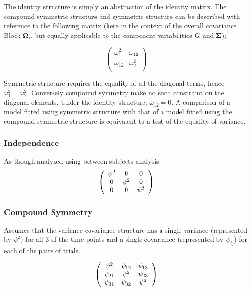 \documentclass[12pt, a4paper]{report}
\theoremstyle{plain}
\theoremstyle{definition}
\theoremstyle{remark}
\begin{document}
	The identity structure is simply an abstraction of the identity matrix. The compound symmetric structure and symmetric structure can be described with reference to the following matrix (here in the context of the overall covariance Block-$\boldsymbol{\Omega}_i$, but equally applicable to the component variabilities $\boldsymbol{G}$ and $\boldsymbol{\Sigma}$);
	
	\[\left( \begin{array}{cc}
	\omega^2_1  & \omega_{12} \\
	\omega_{12} & \omega^2_2 \\
	\end{array}\right) \]
	
	Symmetric structure requires the equality of all the diagonal terms, hence $\omega^2_1 = \omega^2_2$. Conversely compound symmetry make no such constraint on the diagonal elements. Under the identity structure, $\omega_{12} = 0$.
	A comparison of a model fitted using symmetric structure with that of a model fitted using the compound symmetric structure is equivalent to a test of the equality of variance.
	
	

		\subsubsection*{Independence}
		
		As though analyzed using between subjects analysis.
		\[
		\left(
		\begin{array}{c c c}
		\psi^2 & 0 & 0   \\
		0 & \psi^2 & 0   \\
		0 & 0 & \psi^2   \\
		\end{array}%
		\right)
		\]	

			
	\subsubsection*{Compound Symmetry}
	
	Assumes that the variance-covariance structure has a single variance (represented by $\psi^2$)
	for all 3 of the time points and a single covariance (represented by $\psi_{ij}$) for each of the pairs of trials.
	
	\[
	\left(%
	\begin{array}{c c c}
	\psi^2 &  \psi_{12} & \psi_{13}   \\
	\psi_{21} & \psi^2 & \psi_{23}   \\
	\psi_{31} & \psi_{32} & \psi^2   \\
	\end{array}%
	\right)
	\]
		
\end{document}
